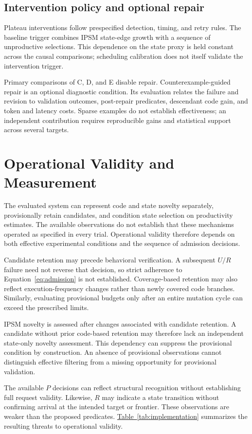 \documentclass[final,5p,times,number]{elsarticle}
\newcommand{\namedref}[2]{\hyperref[#2]{#1~\ref*{#2}}}
\begin{document}
\subsection{Intervention policy and optional repair}
Plateau interventions follow prespecified detection, timing, and retry rules. The baseline trigger combines IPSM state-edge growth with a sequence of unproductive selections. This dependence on the state proxy is held constant across the causal comparisons; scheduling calibration does not itself validate the intervention trigger.

Primary comparisons of C, D, and E disable repair. Counterexample-guided repair is an optional diagnostic condition. Its evaluation relates the failure and revision to validation outcomes, post-repair predicates, descendant code gain, and token and latency costs. Sparse examples do not establish effectiveness; an independent contribution requires reproducible gains and statistical support across several targets.


\section{Operational Validity and Measurement}
\label{sec:implementation}
The evaluated system can represent code and state novelty separately, provisionally retain candidates, and condition state selection on productivity estimates. The available observations do not establish that these mechanisms operated as specified in every trial. Operational validity therefore depends on both effective experimental conditions and the sequence of admission decisions.

Candidate retention may precede behavioral verification. A subsequent $U/R$ failure need not reverse that decision, so strict adherence to Equation~\ref{eq:admission} is not established. Coverage-based retention may also reflect execution-frequency changes rather than newly covered code branches. Similarly, evaluating provisional budgets only after an entire mutation cycle can exceed the prescribed limits.

IPSM novelty is assessed after changes associated with candidate retention. A candidate without prior code-based retention may therefore lack an independent state-only novelty assessment. This dependency can suppress the provisional condition by construction. An absence of provisional observations cannot distinguish effective filtering from a missing opportunity for provisional validation.

The available $P$ decisions can reflect structural recognition without establishing full request validity. Likewise, $R$ may indicate a state transition without confirming arrival at the intended target or frontier. These observations are weaker than the proposed predicates. \namedref{Table}{tab:implementation} summarizes the resulting threats to operational validity.
\end{document}
